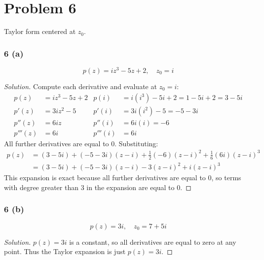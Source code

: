 \documentclass{article}
\newenvironment{solution}{
\begin{proof}[Solution]}{
\end{proof}}
\begin{document}
\section*{Problem 6}
Taylor form centered at $z_0$.

\subsubsection*{6 (a)}
\[
  p(z) = iz^3 - 5z + 2, \quad z_0 = i
\]
\begin{solution}
  Compute each derivative and evaluate at $z_0 = i$:
  \begin{align*}
    p(z) &= iz^3 - 5z + 2 & p(i) &= i(i^3) - 5i + 2 = 1 - 5i + 2 = 3 - 5i
    \\ p'(z) &= 3iz^2 - 5 & p'(i) &= 3i(i^2) - 5 = -5 - 3i
    \\ p''(z) &= 6iz & p''(i) &= 6i(i) = -6
    \\ p'''(z) &= 6i & p'''(i) &= 6i
  \end{align*}
  All further derivatives are equal to $0$. Substituting:
  \begin{align*}
    p(z)
    &= (3 - 5i) + (-5 - 3i)(z - i) + \frac{1}{2}(-6)(z - i)^2
    + \frac{1}{6}(6i)(z - i)^3
    \\ &= (3 - 5i) + (-5 - 3i)(z - i) - 3(z - i)^2 + i(z - i)^3
  \end{align*}
  This expansion is exact because all further derivatives are equal to $0$, so
  terms with degree greater than 3 in the expansion are equal to $0$.
\end{solution}

\subsubsection*{6 (b)}
\[
  p(z) = 3i, \quad z_0 = 7 + 5i
\]
\begin{solution}
  $p(z) = 3i$ is a constant, so all derivatives are equal to zero at any point.
  Thus the Taylor expansion is just $p(z) = 3i$.
\end{solution}
\end{document}
